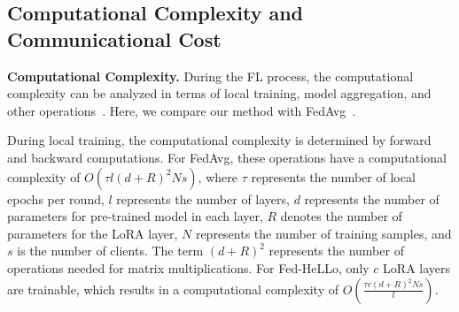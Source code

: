 \documentclass[lettersize,journal]{IEEEtran}
\begin{document}
\subsection{Computational Complexity and Communicational Cost}\label{sec:complexity}

{\textbf{Computational Complexity.}} 
%
%
%
%
%
{During the FL process, the computational complexity can be analyzed in terms of local training, model aggregation, and other operations~\cite{wu2022node,zhou2022exact}. Here, we compare our method with FedAvg~\cite{mcmahan2017communication}.}

{During local training, the computational complexity is determined by forward and backward computations. For FedAvg, these operations have a computational complexity of $O(\tau l (d+R)^2 N s)$, where $\tau$ represents the number of local epochs per round, $l$ represents the number of layers, $d$ represents the number of parameters for pre-trained model in each layer, $R$ denotes the number of parameters for the LoRA layer, $N$ represents the number of training samples, and $s$ is the number of clients. The term $(d+R)^2$ represents the number of operations needed for matrix multiplications. 
For Fed-HeLLo, only $c$ LoRA layers are trainable, which results in a computational complexity of $O(\frac{\tau c (d+R)^2 N s}{l})$}.
\end{document}
